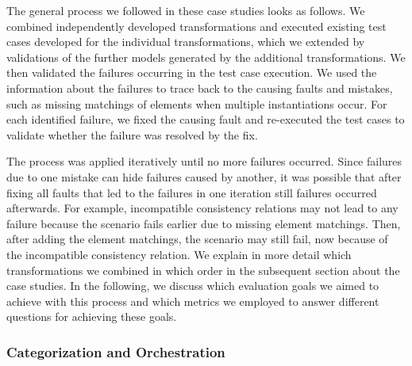 The general process we followed in these case studies looks as follows.
We combined independently developed transformations and executed existing test cases developed for the individual transformations, which we extended by validations of the further models generated by the additional transformations.
We then validated the failures occurring in the test case execution.
We used the information about the failures to trace back to the causing faults and mistakes, such as missing matchings of elements when multiple instantiations occur.
For each identified failure, we fixed the causing fault and re-executed the test cases to validate whether the failure was resolved by the fix.

The process was applied iteratively until no more failures occurred.
Since failures due to one mistake can hide failures caused by another, it was possible that after fixing all faults that led to the failures in one iteration still failures occurred afterwards.
For example, incompatible consistency relations may not lead to any failure because the scenario fails earlier due to missing element matchings. Then, after adding the element matchings, the scenario may still fail, now because of the incompatible consistency relation.
We explain in more detail which transformations we combined in which order in the subsequent section about the case studies.
In the following, we discuss which evaluation goals we aimed to achieve with this process and which metrics we employed to answer different questions for achieving these goals.


\subsubsection{Categorization and Orchestration}

